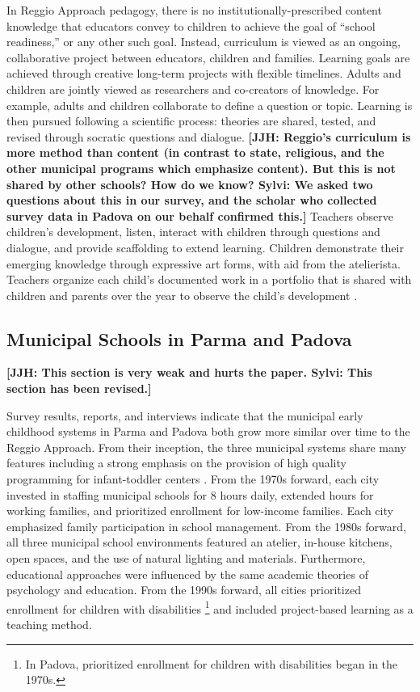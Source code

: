 In Reggio Approach pedagogy, there is no institutionally-prescribed content knowledge that educators convey to children to achieve the goal of ``school readiness,'' or any other such goal. Instead, curriculum is viewed as an ongoing, collaborative project between educators, children and families. Learning goals are achieved through creative long-term projects with flexible timelines. Adults and children are jointly viewed as researchers and co-creators of knowledge. For example, adults and children collaborate to define a question or topic. Learning is then pursued following a scientific process: theories are shared, tested, and revised through socratic questions and dialogue. \textbf{[JJH: Reggio's curriculum is more method than content (in contrast to state, religious, and the other municipal programs which emphasize content). But this is not shared by other schools? How do we know? Sylvi: We asked two questions about this in our survey, and the scholar who collected survey data in Padova on our behalf confirmed this.]} Teachers observe children's development, listen, interact with children through questions and dialogue, and provide scaffolding to extend learning. Children demonstrate their emerging knowledge through expressive art forms, with aid from the atelierista. Teachers organize each child's documented work in a portfolio that is shared with children and parents over the year to observe the child's development \citep{Rinaldi_2006_ReggioEmilia_BOOK,Giudici-Nicolosi_2014_Reggio-Approach}.

\subsection{Municipal Schools in Parma and Padova}

\textbf{[JJH: This section is very weak and hurts the paper. Sylvi: This section has been revised.]}

Survey results, reports, and interviews indicate that the municipal early childhood systems in Parma and Padova both grow more similar over time to the Reggio Approach. From their inception, the three municipal systems share many features including a strong emphasis on the provision of high quality programming for infant-toddler centers \citep{Ghedini_2001_Ital-Natl-Policy}. From the 1970s forward, each city invested in staffing municipal schools for 8 hours daily, extended hours for working families, and prioritized enrollment for low-income families. Each city emphasized family participation in school management. From the 1980s forward, all three municipal school environments featured an atelier, in-house kitchens, open spaces, and the use of natural lighting and materials. Furthermore, educational approaches were influenced by the same academic theories of psychology and education. From the 1990s forward, all cities prioritized enrollment for children with disabilities \footnote{In Padova, prioritized enrollment for children with disabilities began in the 1970s.} and included project-based learning as a teaching method.


